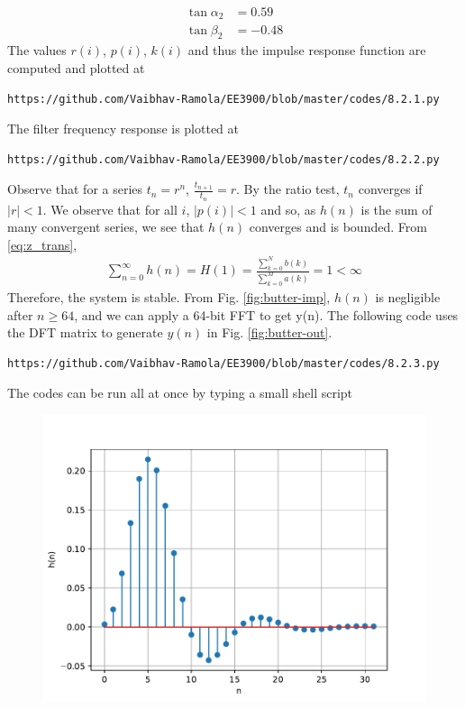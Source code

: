 \documentclass[journal,12pt,twocolumn]{IEEEtran}
\renewcommand\thesection{\arabic{section}}
\begin{document}
\begin{enumerate}[label=\thesection.\arabic*]
\begin{align}
\tan{\alpha_2} &= 0.59 \\
\tan{\beta_2} &= -0.48
\label{eq:h-params}
\end{align}
The values $r(i)$, $p(i)$, $k(i)$ and thus the impulse response function are computed and plotted at
\begin{lstlisting}
https://github.com/Vaibhav-Ramola/EE3900/blob/master/codes/8.2.1.py
\end{lstlisting}
The filter frequency response is plotted at
\begin{lstlisting}
https://github.com/Vaibhav-Ramola/EE3900/blob/master/codes/8.2.2.py
\end{lstlisting}
Observe that for a series $t_n = r^n$, $\frac{t_{n + 1}}{t_n} = r$.
By the ratio test, $t_n$ converges if $|r| < 1$. We observe that for all $i$, 
$|p(i)| < 1$ and so, as $h(n)$ is the sum of many convergent series,
we see that $h(n)$ converges and is bounded. From \eqref{eq:z_trans},
\begin{align}
\sum_{n = 0}^{\infty}h(n) = H(1) = \frac{\sum_{k = 0}^{N}b(k)}{\sum_{k = 0}^{M}a(k)} = 1 < \infty
\end{align}
Therefore, the system is stable. From
Fig. \eqref{fig:butter-imp}, $h(n)$ is negligible after $n \geq 64$, and we
can apply a 64-bit FFT to get y(n). The following code uses the DFT matrix
to generate $y(n)$ in Fig. \eqref{fig:butter-out}.
\begin{lstlisting}
https://github.com/Vaibhav-Ramola/EE3900/blob/master/codes/8.2.3.py
\end{lstlisting}
The codes can be run all at once by typing a small shell script
\begin{figure}[!htb]
	\includegraphics[width=\columnwidth]{./figs/8.2.1.pdf}

\end{figure}
\end{enumerate}
\end{document}
